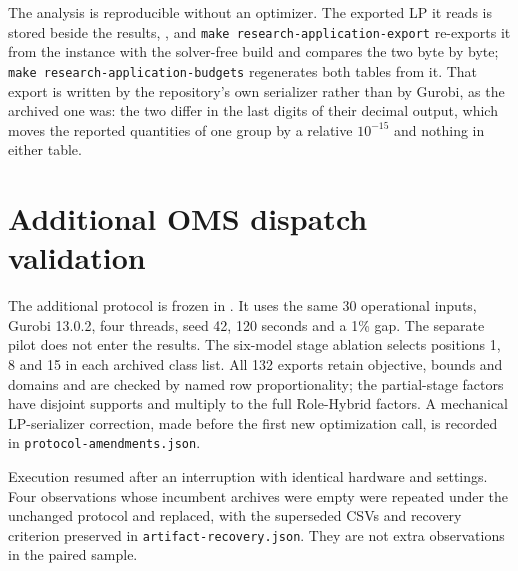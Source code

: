 \documentclass[11pt]{article}
\begin{document}
\begin{table}[tb]
\centering\small
\caption{Tightening the declared budgets of the application table. For each constraint group of
caso46e, the smallest common multiplier of the declared budgets at which the kernel is still
admissible on every row of the group, with $\epsilon=10^{-6}$ and the coefficient window
$[10^{-9},10^{9}]$. A multiplier of one is the budget declared in the main text; smaller means a
tighter tolerance. The sweep covers $10^{-16}$ to $10^{2}$.}
\label{tab:application-budget-sensitivity}

\end{table}

The analysis is reproducible without an optimizer. The exported LP it reads is stored beside the
results, , and
\texttt{make research-application-export} re-exports it from the instance with the solver-free
build and compares the two byte by byte; \texttt{make research-application-budgets} regenerates
both tables from it. That export is written by the repository's own serializer rather than by
Gurobi, as the archived one was: the two differ in the last digits of their decimal output, which
moves the reported quantities of one group by a relative $10^{-15}$ and nothing in either table.

\section{Additional OMS dispatch validation}
The additional protocol is frozen in
.
It uses the same 30 operational inputs, Gurobi 13.0.2, four threads, seed 42,
120 seconds and a 1\% gap. The separate pilot does not enter the results.
The six-model stage ablation selects positions 1, 8 and 15 in each archived class list.
All 132 exports retain objective, bounds and domains and are checked by named
row proportionality; the partial-stage factors have disjoint supports and multiply
to the full Role-Hybrid factors. A mechanical LP-serializer correction, made before
the first new optimization call, is recorded in \texttt{protocol-amendments.json}.

Execution resumed after an interruption with identical hardware and settings. Four
observations whose incumbent archives were empty were repeated under the unchanged
protocol and replaced, with the superseded CSVs and recovery criterion preserved in
\texttt{artifact-recovery.json}. They are not extra observations in the paired sample.
\end{document}

